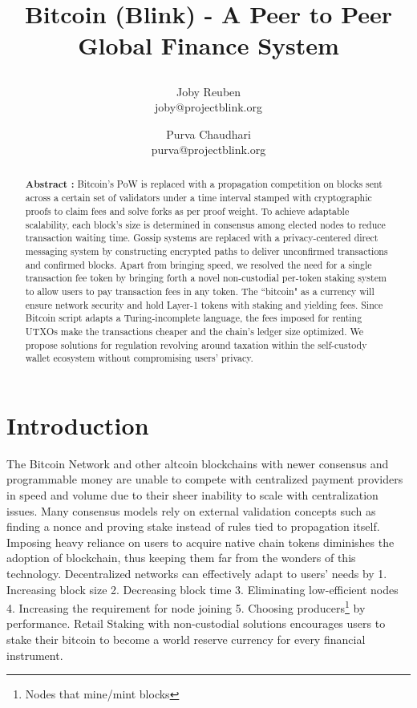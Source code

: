 \documentclass[a4paper,10pt]{article}
\title{
 \large \textbf{Bitcoin (Blink) - A Peer to Peer Global Finance System}
\author{ \myfontt Joby Reuben \\ \myfontt joby@projectblink.org \and  \myfontt Purva Chaudhari \\ \myfontt purva@projectblink.org}}
\date{}
\begin{document}
\maketitle
\begin{abstract}
\noindent \textbf{Abstract :} Bitcoin's PoW is replaced with a propagation competition on blocks sent across a certain set of validators under a time interval stamped with cryptographic proofs to claim fees and solve forks as per proof weight. To achieve adaptable scalability, each block's size is determined in consensus among elected nodes to reduce transaction waiting time. Gossip systems are replaced with a privacy-centered direct messaging system by constructing encrypted paths to deliver unconfirmed transactions and confirmed blocks. Apart from bringing speed, we resolved the need for a single transaction fee token by bringing forth a novel non-custodial per-token staking system to allow users to pay transaction fees in any token. The ``bitcoin" as a currency will ensure network security and hold Layer-1 tokens with staking and yielding fees. Since Bitcoin script adapts a Turing-incomplete language, the fees imposed for renting UTXOs make the transactions cheaper and the chain's ledger size optimized. We propose solutions for regulation revolving around taxation within the self-custody wallet ecosystem without compromising users' privacy. 
\end{abstract}
\section{Introduction}
The Bitcoin Network \cite{nakamoto2008bitcoin} and other altcoin blockchains with newer consensus and programmable money are unable to compete with centralized payment providers in speed and volume due to their sheer inability to scale with centralization issues. Many consensus models rely on external validation concepts such as finding a nonce and proving stake instead of rules tied to propagation itself. Imposing heavy reliance on users to acquire native chain tokens diminishes the adoption of blockchain, thus keeping them far from the wonders of this technology. Decentralized networks can effectively adapt to users’ needs by 1. Increasing block size 2. Decreasing block time 3. Eliminating low-efficient nodes 4. Increasing the requirement for node joining 5. Choosing producers\footnote{Nodes that mine/mint blocks} by performance. Retail Staking with non-custodial solutions encourages users to stake their bitcoin to become a world reserve currency for every financial instrument.
\end{document}
